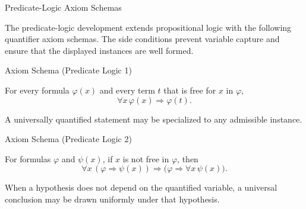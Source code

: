 \begin{topicbox}{Predicate-Logic Axiom Schemas}
\begin{exposition}
The predicate-logic development extends propositional logic with the following
quantifier axiom schemas. The side conditions prevent variable capture and
ensure that the displayed instances are well formed.
\end{exposition}
\end{topicbox}

\begin{axiombox}{Axiom Schema (Predicate Logic 1)}
\begin{axiom}
\label{ax:predicate-logic-universal-instantiation}
For every formula $\varphi(x)$ and every term $t$ that is free for $x$ in
$\varphi$,
\[
\forall x\,\varphi(x) \Longrightarrow \varphi(t).
\]
\end{axiom}
\end{axiombox}

\begin{remark*}[Interpretation]
A universally quantified statement may be specialized to any admissible
instance.
\end{remark*}

\NoLocalDependencies

\begin{axiombox}{Axiom Schema (Predicate Logic 2)}
\begin{axiom}
\label{ax:predicate-logic-quantifier-distribution}
For formulas $\varphi$ and $\psi(x)$, if $x$ is not free in $\varphi$, then
\[
\forall x\,(\varphi \Longrightarrow \psi(x))
\Longrightarrow
\bigl(\varphi \Longrightarrow \forall x\,\psi(x)\bigr).
\]
\end{axiom}
\end{axiombox}

\begin{remark*}[Interpretation]
When a hypothesis does not depend on the quantified variable, a universal
conclusion may be drawn uniformly under that hypothesis.
\end{remark*}

\NoLocalDependencies
